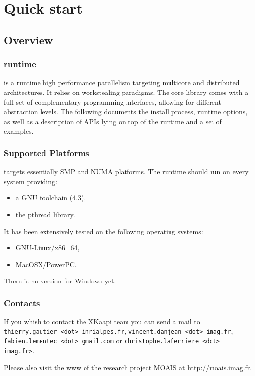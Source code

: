 \chapter{Quick start}
\label{chap:install}
\section{Overview}

\subsection{\kaapi runtime}
\kaapi is a runtime high performance parallelism targeting multicore and
distributed architectures.
It relies on workstealing paradigms.
The core library comes with a full set of complementary programming interfaces,
allowing for different abstraction levels.
The following documents the install process, runtime options, as well as a
description of APIs lying on top of the runtime and a set of examples.

\subsection{Supported Platforms}
\kaapi targets essentially SMP and NUMA platforms. The runtime should run
on every system providing:
\begin{itemize}
\item a GNU toolchain (4.3),
\item the pthread library.
\end{itemize}
It has been extensively tested on the following operating systems:
\begin{itemize}
\item GNU-Linux/x86\_64,
\item MacOSX/PowerPC.
\end{itemize}
There is no version for Windows yet.

\subsection{\kaapi Contacts}
If you whish to contact the XKaapi team you can send a mail to \verb+thierry.gautier <dot> inrialpes.fr+, \verb+vincent.danjean <dot> imag.fr+, \verb+fabien.lementec <dot> gmail.com+ or \verb+christophe.laferriere <dot> imag.fr>+.

\noindent Please also visit the www of the research project MOAIS at  \url{http://moais.imag.fr}.


